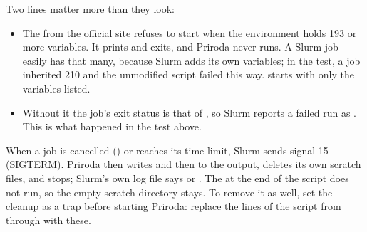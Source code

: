 \documentclass[letterpaper,10pt,english,openany,oneside]{sphinxmanual}
\begin{document}
\sphinxAtStartPar
Two lines matter more than they look:
\begin{itemize}
\item {} 
\sphinxAtStartPar
{} The  from the official site refuses to start when the environment holds 193 or more
variables. It prints  and exits, and Priroda never runs. A Slurm job easily
has that many, because Slurm adds its own  variables; in the test, a job inherited 210 and the unmodified
script failed this way.  starts  with only the variables listed.

\item {} 
\sphinxAtStartPar
{} Without it the job’s exit status is that of , so Slurm reports a failed run as .
This is what happened in the test above.

\end{itemize}



\sphinxAtStartPar
When a job is cancelled () or reaches its time limit, Slurm sends signal 15 (SIGTERM). Priroda then writes
 and then  to the output, deletes its own scratch files, and stops;
Slurm’s own log file says  or . The  at the end of the script does
not run, so the empty scratch directory stays. To remove it as well, set the clean\sphinxhyphen{}up as a trap before starting
Priroda: replace the lines of the script from  through  with these.
\end{document}
